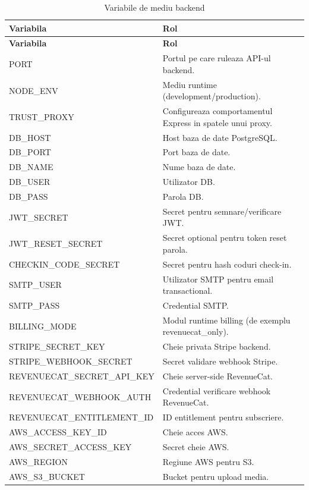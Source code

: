 \begin{longtable}{p{} p{}}
\caption{Variabile de mediu backend} \\
\toprule
\textbf{Variabila} & \textbf{Rol} \\
\midrule
\endfirsthead
\toprule
\textbf{Variabila} & \textbf{Rol} \\
\midrule
\endhead

PORT & Portul pe care ruleaza API-ul backend. \\
NODE\_ENV & Mediu runtime (development/production). \\
TRUST\_PROXY & Configureaza comportamentul Express in spatele unui proxy. \\

DB\_HOST & Host baza de date PostgreSQL. \\
DB\_PORT & Port baza de date. \\
DB\_NAME & Nume baza de date. \\
DB\_USER & Utilizator DB. \\
DB\_PASS & Parola DB. \\

JWT\_SECRET & Secret pentru semnare/verificare JWT. \\
JWT\_RESET\_SECRET & Secret optional pentru token reset parola. \\
CHECKIN\_CODE\_SECRET & Secret pentru hash coduri check-in. \\

SMTP\_USER & Utilizator SMTP pentru email transactional. \\
SMTP\_PASS & Credential SMTP. \\

BILLING\_MODE & Modul runtime billing (de exemplu revenuecat\_only). \\
STRIPE\_SECRET\_KEY & Cheie privata Stripe backend. \\
STRIPE\_WEBHOOK\_SECRET & Secret validare webhook Stripe. \\
REVENUECAT\_SECRET\_API\_KEY & Cheie server-side RevenueCat. \\
REVENUECAT\_WEBHOOK\_AUTH & Credential verificare webhook RevenueCat. \\
REVENUECAT\_ENTITLEMENT\_ID & ID entitlement pentru subscriere. \\

AWS\_ACCESS\_KEY\_ID & Cheie acces AWS. \\
AWS\_SECRET\_ACCESS\_KEY & Secret cheie AWS. \\
AWS\_REGION & Regiune AWS pentru S3. \\
AWS\_S3\_BUCKET & Bucket pentru upload media. \\


\end{longtable}
